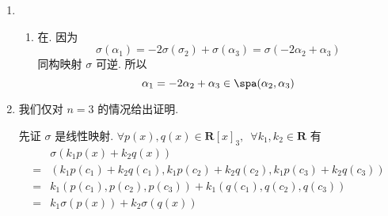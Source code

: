 \begin{enumerate}
    \item \begin{enumerate}
        \item 在. 因为
              \[ \sigma(\alpha_1) = -2 \sigma(\sigma_2) + \sigma(\alpha_3) = \sigma(-2 \alpha_2 + \alpha_3) \]
              同构映射 $ \sigma $ 可逆. 所以
              \[ \alpha_1 = -2 \alpha_2 + \alpha_3 \in \spa(\alpha_2, \alpha_3) \]
    \end{enumerate}

    \item 我们仅对 $ n = 3 $ 的情况给出证明. %

          先证 $ \sigma $ 是线性映射. $ \forall p(x), q(x) \in \mathbf{R}[x]_3,\enspace \forall k_1, k_2 \in \mathbf{R} $ 有
          \begin{align*}
                  & \sigma(k_1 p(x) + k_2 q(x))                                                 \\
              ={} & (k_1 p(c_1) + k_2 q(c_1), k_1 p(c_2) + k_2 q(c_2), k_1 p(c_3) + k_2 q(c_3)) \\
              ={} & k_1(p(c_1), p(c_2), p(c_3)) + k_1(q(c_1), q(c_2), q(c_3))                   \\
              ={} & k_1 \sigma(p(x)) + k_2 \sigma(q(x))
          \end{align*}


\end{enumerate}
